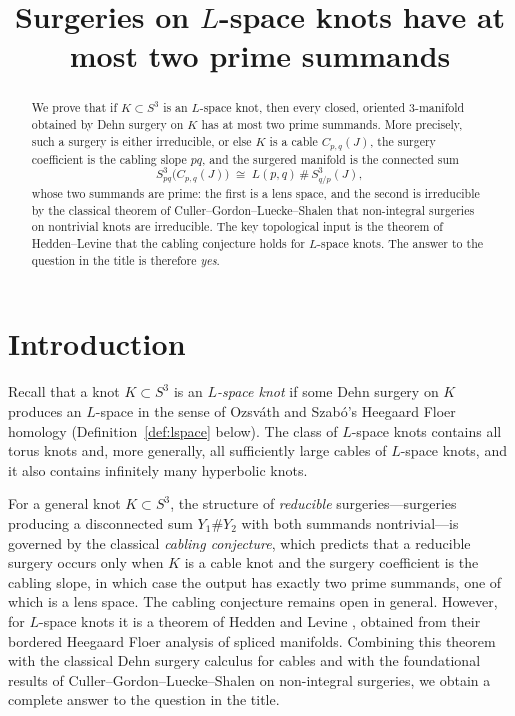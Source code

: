 \documentclass[11pt]{article}
\theoremstyle{definition}
\theoremstyle{remark}
\numberwithin{equation}{section}
\begin{document}
\title{Surgeries on $L$-space knots have at most two prime summands}
\author{}
\date{}
\maketitle

\begin{abstract}
We prove that if $K\subset S^{3}$ is an $L$-space knot, then every closed,
oriented $3$-manifold obtained by Dehn surgery on $K$ has at most two
prime summands.  More precisely, such a surgery is either irreducible,
or else $K$ is a cable $C_{p,q}(J)$, the surgery coefficient is the cabling
slope $pq$, and the surgered manifold is the connected sum
\[
S^{3}_{pq}\bigl(C_{p,q}(J)\bigr)\;\cong\;L(p,q)\,\#\,S^{3}_{q/p}(J),
\]
whose two summands are prime: the first is a lens space, and the second is
irreducible by the classical theorem of Culler--Gordon--Luecke--Shalen that
non-integral surgeries on nontrivial knots are irreducible.  The key
topological input is the theorem of Hedden--Levine that the cabling
conjecture holds for $L$-space knots.  The answer to the question in the
title is therefore \emph{yes}.
\end{abstract}

\section{Introduction}\label{sec:intro}

Recall that a knot $K\subset S^{3}$ is an \emph{$L$-space knot} if some
Dehn surgery on $K$ produces an $L$-space in the sense of Ozsv\'ath and
Szab\'o's Heegaard Floer homology (Definition~\ref{def:lspace} below).
The class of $L$-space knots contains all torus knots and, more generally,
all sufficiently large cables of $L$-space knots, and it also contains
infinitely many hyperbolic knots.

For a general knot $K\subset S^{3}$, the structure of \emph{reducible}
surgeries---surgeries producing a disconnected sum $Y_{1}\#Y_{2}$ with
both summands nontrivial---is governed by the classical \emph{cabling
conjecture}, which predicts that a reducible surgery occurs only when $K$
is a cable knot and the surgery coefficient is the cabling slope, in which
case the output has exactly two prime summands, one of which is a lens
space.  The cabling conjecture remains open in general.  However, for
$L$-space knots it is a theorem of Hedden and Levine
\cite{HL16}, obtained from their bordered Heegaard Floer analysis of
spliced manifolds.  Combining this theorem with the classical Dehn surgery
calculus for cables and with the foundational results of
Culler--Gordon--Luecke--Shalen on non-integral surgeries, we obtain a
complete answer to the question in the title.
\end{document}
